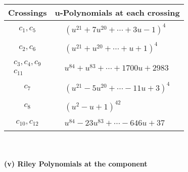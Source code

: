\documentclass[1p]{elsarticle_modified}
\theoremstyle{definition}
\begin{document}
\begin{tabular}{m{50pt}|m{274pt}}
Crossings & \hspace{64pt}u-Polynomials at each crossing \\
\hline $$\begin{aligned}c_{1},c_{5}\end{aligned}$$&$\begin{aligned}
&(u^{21}+7 u^{20}+\cdots+3 u-1)^{4}
\end{aligned}$\\
\hline $$\begin{aligned}c_{2},c_{6}\end{aligned}$$&$\begin{aligned}
&(u^{21}+u^{20}+\cdots+u+1)^{4}
\end{aligned}$\\
\hline $$\begin{aligned}c_{3},c_{4},c_{9}\\c_{11}\end{aligned}$$&$\begin{aligned}
&u^{84}+u^{83}+\cdots+1700 u+2983
\end{aligned}$\\
\hline $$\begin{aligned}c_{7}\end{aligned}$$&$\begin{aligned}
&(u^{21}-5 u^{20}+\cdots-11 u+3)^{4}
\end{aligned}$\\
\hline $$\begin{aligned}c_{8}\end{aligned}$$&$\begin{aligned}
&(u^2- u+1)^{42}
\end{aligned}$\\
\hline $$\begin{aligned}c_{10},c_{12}\end{aligned}$$&$\begin{aligned}
&u^{84}-23 u^{83}+\cdots-646 u+37
\end{aligned}$\\
\hline
\end{tabular}\\~\\
\newpage\renewcommand{\arraystretch}{1}
\flushleft \textbf{(v) Riley Polynomials at the component}\newline \\
\end{document}
